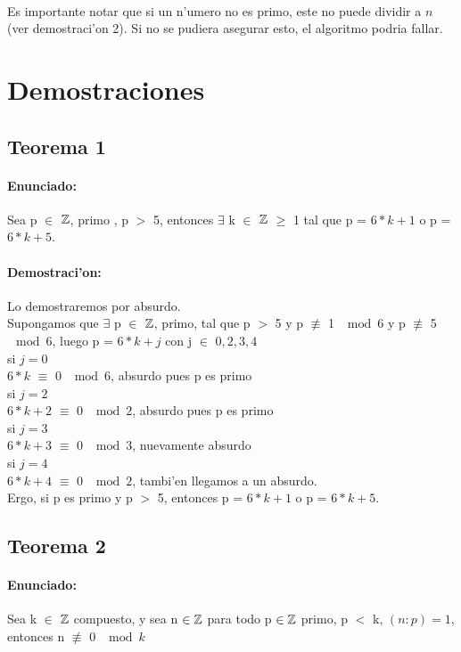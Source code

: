 \paragraph{}
Es importante notar que si un n'umero no es primo, este no puede dividir a $n$ (ver demostraci'on 2). Si 
no se pudiera asegurar esto, el algoritmo podria fallar.

\section{Demostraciones}
\subsection{Teorema 1}
\label{demo1}
\paragraph{Enunciado:}
Sea p $\in$ ${\mathbb Z}$, primo , p $>$ 5, entonces $\exists$ k $\in$ ${\mathbb Z}$ $\geq$ 1  tal que p = $6*k+1$ o p = $6*k +5$.
\paragraph{Demostraci'on:}
Lo demostraremos por absurdo.\\ 
Supongamos que $\exists$ p $\in$ ${\mathbb Z}$, primo, tal que p $>$ 5 y p $\not\equiv$ 1  $\mod{6}$ y p
$\not\equiv$ 5  $\mod{6}$, luego p = $6*k + j$ con j $\in$ ${0,2,3,4}$ \\
si $j = 0$\\
$6*k$ $\equiv$ 0  $\mod{6}$, absurdo pues p es primo\\
si $j = 2$\\
$6*k + 2$ $\equiv$ 0  $\mod{2}$, absurdo pues p es primo \\
si $j = 3$\\
$6*k + 3$ $\equiv$ 0  $\mod{3}$, nuevamente absurdo\\
si $j = 4$\\
$6*k + 4$ $\equiv$ 0  $\mod{2}$, tambi'en llegamos a un absurdo.\\
Ergo, si p es primo y p $>$ 5, entonces p = $6*k+1$ o p = $6*k +5$.

\subsection{Teorema 2}
\label{demo2}
\paragraph{Enunciado:}
Sea k $\in$ ${\mathbb Z}$ compuesto, y sea n ${\in {\mathbb Z}}$ para todo p ${\in {\mathbb Z}}$ primo, p $<$ k, $(n:p) = 1$, entonces n $\not\equiv$ 0 $\mod{k}$
